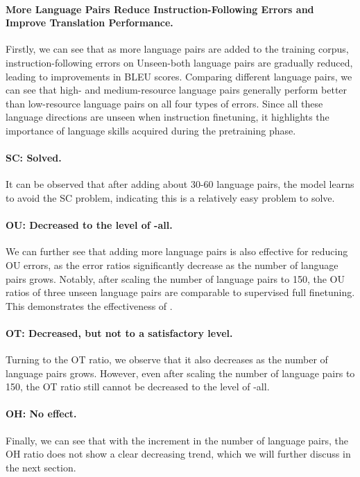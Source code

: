 \paragraph{More Language Pairs Reduce Instruction-Following Errors and Improve Translation Performance.}
Firstly, we can see that as more language pairs are added to the training corpus, instruction-following errors on Unseen-both language pairs are gradually reduced, leading to improvements in BLEU scores. 
Comparing different language pairs, we can see that high- and medium-resource language pairs generally perform better than low-resource language pairs on all four types of errors. Since all these language directions are unseen when instruction finetuning, it highlights the importance of language skills acquired during the pretraining phase.





\paragraph{SC: Solved.} It can be observed that after adding about 30-60 language pairs, the model learns to avoid the SC problem, indicating this is a relatively easy problem to solve.

\paragraph{OU: Decreased to the level of \methodend-all. } We can further see that adding more language pairs is also effective for reducing OU errors, as the error ratios significantly decrease as the number of language pairs grows. Notably, after scaling the number of language pairs to 150, the OU ratios of three unseen language pairs are comparable to supervised full finetuning. This demonstrates the effectiveness of \methodend.

\paragraph{OT: Decreased, but not to a satisfactory level.} Turning to the OT ratio, we observe that it also decreases as the number of language pairs grows. However, even after scaling the number of language pairs to 150, the OT ratio still cannot be decreased to the level of \methodend-all.

\paragraph{OH: No effect.} Finally, we can see that with the increment in the number of language pairs, the OH ratio does not show a clear decreasing trend, which we will further discuss in the next section.




